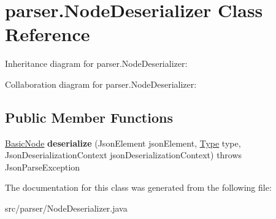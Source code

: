 \hypertarget{classparser_1_1_node_deserializer}{}\section{parser.\+Node\+Deserializer Class Reference}
\label{classparser_1_1_node_deserializer}


Inheritance diagram for parser.\+Node\+Deserializer\+:


Collaboration diagram for parser.\+Node\+Deserializer\+:
\subsection*{Public Member Functions}
\begin{DoxyCompactItemize}
\item 
\hyperlink{classparser_1_1_basic_node}{Basic\+Node} {\bfseries deserialize} (Json\+Element json\+Element, \hyperlink{classparser_1_1_type}{Type} type, Json\+Deserialization\+Context json\+Deserialization\+Context)  throws Json\+Parse\+Exception \hypertarget{classparser_1_1_node_deserializer_a4d34de5c70e0956c305ce35e82e8fc7f}{}\label{classparser_1_1_node_deserializer_a4d34de5c70e0956c305ce35e82e8fc7f}

\end{DoxyCompactItemize}


The documentation for this class was generated from the following file\+:\begin{DoxyCompactItemize}
\item 
src/parser/Node\+Deserializer.\+java\end{DoxyCompactItemize}
